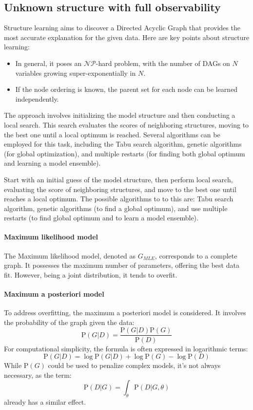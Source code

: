 \subsection{Unknown structure with full observability}
Structure learning aims to discover a Directed Acyclic Graph that provides the most accurate explanation for the given data. 
Here are key points about structure learning:
\begin{itemize}
    \item In general, it poses an $\mathcal{NP}$-hard problem, with the number of DAGs on $N$ variables growing super-exponentially in $N$.
    \item If the node ordering is known, the parent set for each node can be learned independently.
\end{itemize}
The approach involves initializing the model structure and then conducting a local search.
This search evaluates the scores of neighboring structures, moving to the best one until a local optimum is reached.
Several algorithms can be employed for this task, including the Tabu search algorithm, genetic algorithms (for global optimization), and multiple restarts (for finding both global optimum and learning a model ensemble).

Start with an initial guess of the model structure, then perform local search, evaluating the score of neighboring structures, and move to the best one until reaches a local optimum.
The possible algorithms to to this are: Tabu search algorithm, genetic algorithms (to find a global optimum), and use multiple restarts (to find global optimum and to learn a model ensemble). 

\paragraph*{Maximum likelihood model}
The Maximum likelihood model, denoted as $G_{MLE}$, corresponds to a complete graph. 
It possesses the maximum number of parameters, offering the best data fit. 
However, being a joint distribution, it tends to overfit.

\paragraph*{Maximum a posteriori model}
To address overfitting, the maximum a posteriori model is considered. 
It involves the probability of the graph given the data:
\[\text{P}(G|D)=\dfrac{\text{P}(G|D)\text{P}(G)}{\text{P}(D)}\]
For computational simplicity, the formula is often expressed in logarithmic terms:
\[\text{P}(G|D)=\log\text{P}(G|D)+\log\text{P}(G)-\log\text{P}(D)\]
While $\text{P}(G)$ could be used to penalize complex models, it's not always necessary, as the term:
\[\text{P}(D|G)=\int_{\theta} \text{P}(D|G,\theta)\]
already has a similar effect.

